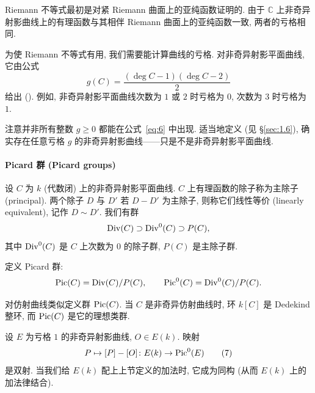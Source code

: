 \begin{remark} \label{thm:1.4.7} 
Riemann 不等式最初是对紧 Riemann 曲面上的亚纯函数证明的. 由于 $\mathbb{C}$ 上非奇异射影曲线上的有理函数与其相伴 Riemann 曲面上的亚纯函数一致, 两者的亏格相同.
\end{remark}

为使 Riemann 不等式有用, 我们需要能计算曲线的亏格. 对非奇异射影平面曲线, 它由公式
\begin{equation} \label{eq:6}
g(C) = \frac{(\deg C - 1)(\deg C - 2)}{2}
\tag{6}
\end{equation}
给出 (\cite[\S8.3, Proposition 3]{fulton1969}). 例如, 非奇异射影平面曲线次数为 $1$ 或 $2$ 时亏格为 $0$, 次数为 $3$ 时亏格为 $1$.

\begin{remark} \label{thm:1.4.8} 
注意并非所有整数 $g\ge 0$ 都能在公式~\eqref{eq:6} 中出现. 适当地定义 (见 \S\ref{sec:1.6}), 确实存在任意亏格 $g$ 的非奇异射影曲线——只是不是非奇异射影平面曲线.
\end{remark}

\paragraph{Picard 群 (Picard groups)}
设 $C$ 为 $k$ (代数闭) 上的非奇异射影平面曲线. $C$ 上有理函数的除子称为主除子 (principal). 两个除子 $D$ 与 $D'$ 若 $D - D'$ 为主除子, 则称它们线性等价 (linearly equivalent), 记作 $D\sim D'$. 我们有群
\[
\operatorname{Div}(C)\supset\operatorname{Div}^0(C)\supset P(C),
\]
其中 $\operatorname{Div}^0(C)$ 是 $C$ 上次数为 $0$ 的除子群, $P(C)$ 是主除子群.

定义 Picard 群:
\[
\operatorname{Pic}(C) = \operatorname{Div}(C)/P(C), \qquad
\operatorname{Pic}^0(C) = \operatorname{Div}^0(C)/P(C).
\]

\begin{aside} \label{thm:1.4.9} 
对仿射曲线类似定义群 $\operatorname{Pic}(C)$. 当 $C$ 是非奇异仿射曲线时, 环 $k[C]$ 是 Dedekind 整环, 而 $\operatorname{Pic}(C)$ 是它的理想类群.
\end{aside}

\begin{proposition} \label{thm:1.4.10} 
设 $E$ 为亏格 $1$ 的非奇异射影曲线, $O\in E(k)$. 映射
\begin{equation} \label{eq:7}
P\mapsto[P] - [O]\colon E(k)\to\operatorname{Pic}^0(E)
\tag{7}
\end{equation}
是双射. 当我们给 $E(k)$ 配上上节定义的加法时, 它成为同构 (从而 $E(k)$ 上的加法律结合).
\end{proposition}

